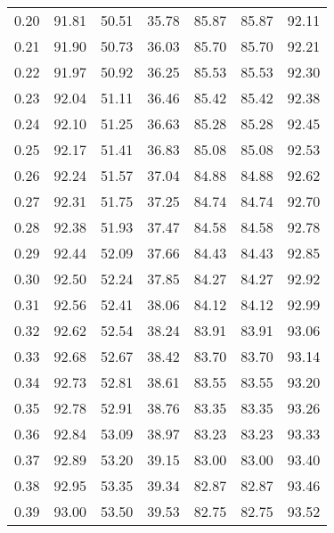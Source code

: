 \begin{tabular}{|c|c|c|c|c|c|c|}
      0.20 &     91.81 &     50.51 &      35.78 &   85.87 &      85.87 &         92.11 \\
      0.21 &     91.90 &     50.73 &      36.03 &   85.70 &      85.70 &         92.21 \\
      0.22 &     91.97 &     50.92 &      36.25 &   85.53 &      85.53 &         92.30 \\
      0.23 &     92.04 &     51.11 &      36.46 &   85.42 &      85.42 &         92.38 \\
      0.24 &     92.10 &     51.25 &      36.63 &   85.28 &      85.28 &         92.45 \\
      0.25 &     92.17 &     51.41 &      36.83 &   85.08 &      85.08 &         92.53 \\
      0.26 &     92.24 &     51.57 &      37.04 &   84.88 &      84.88 &         92.62 \\
      0.27 &     92.31 &     51.75 &      37.25 &   84.74 &      84.74 &         92.70 \\
      0.28 &     92.38 &     51.93 &      37.47 &   84.58 &      84.58 &         92.78 \\
      0.29 &     92.44 &     52.09 &      37.66 &   84.43 &      84.43 &         92.85 \\
      0.30 &     92.50 &     52.24 &      37.85 &   84.27 &      84.27 &         92.92 \\
      0.31 &     92.56 &     52.41 &      38.06 &   84.12 &      84.12 &         92.99 \\
      0.32 &     92.62 &     52.54 &      38.24 &   83.91 &      83.91 &         93.06 \\
      0.33 &     92.68 &     52.67 &      38.42 &   83.70 &      83.70 &         93.14 \\
      0.34 &     92.73 &     52.81 &      38.61 &   83.55 &      83.55 &         93.20 \\
      0.35 &     92.78 &     52.91 &      38.76 &   83.35 &      83.35 &         93.26 \\
      0.36 &     92.84 &     53.09 &      38.97 &   83.23 &      83.23 &         93.33 \\
      0.37 &     92.89 &     53.20 &      39.15 &   83.00 &      83.00 &         93.40 \\
      0.38 &     92.95 &     53.35 &      39.34 &   82.87 &      82.87 &         93.46 \\
      0.39 &     93.00 &     53.50 &      39.53 &   82.75 &      82.75 &         93.52 \\

\end{tabular}
